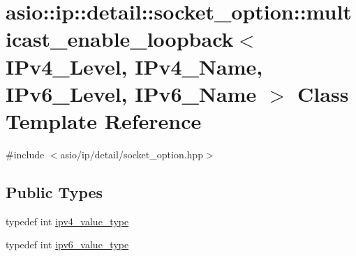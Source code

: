 \hypertarget{classasio_1_1ip_1_1detail_1_1socket__option_1_1multicast__enable__loopback}{}\section{asio\+:\+:ip\+:\+:detail\+:\+:socket\+\_\+option\+:\+:multicast\+\_\+enable\+\_\+loopback$<$ I\+Pv4\+\_\+\+Level, I\+Pv4\+\_\+\+Name, I\+Pv6\+\_\+\+Level, I\+Pv6\+\_\+\+Name $>$ Class Template Reference}
\label{classasio_1_1ip_1_1detail_1_1socket__option_1_1multicast__enable__loopback}


{\ttfamily \#include $<$asio/ip/detail/socket\+\_\+option.\+hpp$>$}

\subsection*{Public Types}
\begin{DoxyCompactItemize}
\item 
typedef int \hyperlink{classasio_1_1ip_1_1detail_1_1socket__option_1_1multicast__enable__loopback_a3b6d854affad183c85edee00aec57436}{ipv4\+\_\+value\+\_\+type}
\item 
typedef int \hyperlink{classasio_1_1ip_1_1detail_1_1socket__option_1_1multicast__enable__loopback_a5156e6110cdc823d829d2bfca58f0a9a}{ipv6\+\_\+value\+\_\+type}
\end{DoxyCompactItemize}

